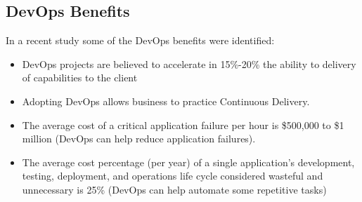         \subsection{DevOps Benefits}
        In a recent study \cite{Elliot2015} some of the DevOps benefits were identified:
  		  \begin{itemize}
  			    \item DevOps projects are believed to accelerate in 15\%-20\% the ability to delivery of capabilities to the client
            \item Adopting DevOps allows business to practice Continuous Delivery.
            \item The average cost of a critical application failure per hour is \$500,000 to \$1 million (DevOps can help reduce application failures).
            \item The average cost percentage (per year) of a single application's development, testing, deployment, and operations life cycle considered wasteful and unnecessary is 25\% (DevOps can help automate some repetitive tasks)
  		  \end{itemize}

